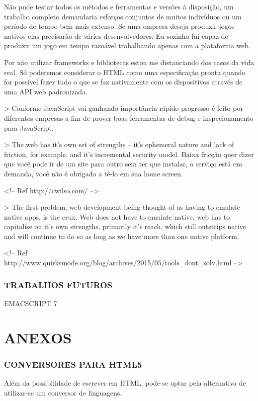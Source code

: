 \documentclass[11pt,a4paper]{article}
\begin{document}
Não pude testar todos os métodos e ferramentas e versões à disposição, um trabalho completo demandaria esforços conjuntos de muitos indivíduos ou um período de tempo bem mais extenso. Se uma empresa deseja produzir jogos nativos elas precisarão de vários desenvolvedores. Eu sozinho fui capaz de produzir um jogo em tempo razoável trabalhando apenas com a plataforma web.

Por não utilizar frameworks e bibliotecas estou me distanciando dos casos da vida real.
Só poderemos considerar o HTML como uma especificação pronta quando for possível fazer tudo o que se faz nativamente com os dispositivos através de uma API web padronizada.

> Conforme JavaScript vai ganhando importância rápido progresso é feito por diferentes empresas a fim de prover boas ferramentas de debug e inspecionamento para JavaScript.

>  The web has it's own set of strengths – it's ephemeral nature and lack of friction, for example, and it's incremental security model. 
Baixa fricção quer dizer que você pode ir de um site para outro sem ter que instalar, o serviço está em demanda, você não é obrigado a tê-lo em sua home screen.

<!-- Ref
http://cwilso.com/
-->

> The first problem, web development being thought of as having to emulate native apps, is the crux. Web does not have to emulate native, web has to capitalise on it's own strengths, primarily it's reach, which still outstrips native and will continue to do so as long as we have more than one native platform.


<!-- Ref
http://www.quirksmode.org/blog/archives/2015/05/tools_dont_solv.html
-->


\subsection{ TRABALHOS FUTUROS}

EMACSCRIPT 7


\chapter{ANEXOS}

\subsection{ CONVERSORES PARA HTML5}
Além da possibilidade de escrever em HTML, pode-se optar pela alternativa de utilizar-se um conversor de linguagens.
\end{document}
